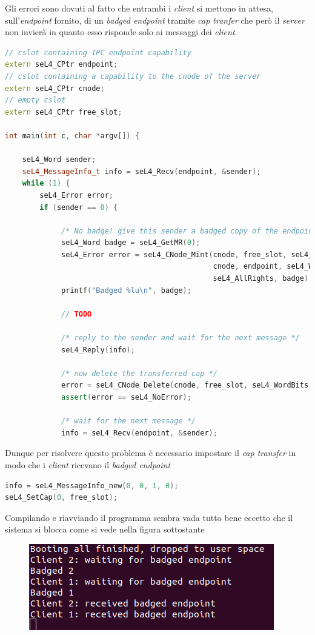 Gli errori sono dovuti al fatto che entrambi i \textit{client} si mettono in attesa, sull'\textit{endpoint} fornito, di un \textit{badged endpoint} tramite \textit{cap tranfer} che però il \textit{server} non invierà in quanto esso risponde solo ai messaggi dei \textit{client}.
\begin{lstlisting}[language=C++]
// cslot containing IPC endpoint capability
extern seL4_CPtr endpoint;
// cslot containing a capability to the cnode of the server
extern seL4_CPtr cnode;
// empty cslot
extern seL4_CPtr free_slot;

int main(int c, char *argv[]) {

	seL4_Word sender;
    seL4_MessageInfo_t info = seL4_Recv(endpoint, &sender);
    while (1) {
	    seL4_Error error;
        if (sender == 0) {

             /* No badge! give this sender a badged copy of the endpoint */
             seL4_Word badge = seL4_GetMR(0);
             seL4_Error error = seL4_CNode_Mint(cnode, free_slot, seL4_WordBits,
                                                cnode, endpoint, seL4_WordBits,
                                                seL4_AllRights, badge);
             printf("Badged %lu\n", badge);

             // TODO
             
             /* reply to the sender and wait for the next message */
             seL4_Reply(info);

             /* now delete the transferred cap */
             error = seL4_CNode_Delete(cnode, free_slot, seL4_WordBits);
             assert(error == seL4_NoError);

             /* wait for the next message */
             info = seL4_Recv(endpoint, &sender);
\end{lstlisting}

Dunque per risolvere questo problema è necessario impostare il \textit{cap transfer} in modo che i \textit{client} ricevano il \textit{badged endpoint}
\begin{lstlisting}[language=C++]
info = seL4_MessageInfo_new(0, 0, 1, 0);
seL4_SetCap(0, free_slot);
\end{lstlisting}

Compilando e riavviando il programma sembra vada tutto bene eccetto che il sistema si blocca come si vede nella figura sottostante
\begin{figure}[H]
  \includegraphics[scale=0.7]{img/DopoBadgeIPC.png}%
  \centering
  \label{fig:AvvioDopoBadge}
\end{figure}

